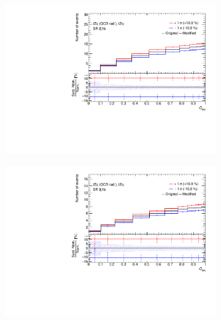 
\begin{figure}[!h] 
  \begin{subfigure}[b]{0.33\linewidth}
    \centering
    \includegraphics[width=\textwidth]{ubonn-thesis/Chapters/Chapters_07/Figure/Data/Systematic/tZq_qcdrad/SR_2j1b_tZq_tZq_XS_QCDscale.pdf} 
    \caption{}
  \end{subfigure}%
  \begin{subfigure}[b]{0.33\linewidth}
    \centering
    \includegraphics[width=\textwidth]{ubonn-thesis/Chapters/Chapters_07/Figure/Data/Systematic/tZq_qcdrad/SR_3j1b_tZq_tZq_XS_QCDscale.pdf} 
    \caption{}
  \end{subfigure} 
  \begin{subfigure}[b]{0.33\linewidth}
    \centering

\end{subfigure}
\end{figure}
